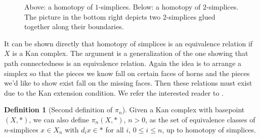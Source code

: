 \documentclass[12pt]{article}
\theoremstyle{plain}
\theoremstyle{definition}
\newtheorem{definition}[theorem]{Definition}
\theoremstyle{remark}
\begin{document}
\begin{figure}[!htp]
\begin{center}
\end{center}
\caption{Above: a homotopy of $1$-simplices. Below: a homotopy of $2$-simplices. The picture in the bottom right depicts two $2$-simplices glued together along their boundaries.}\label{F: fig23}
\end{figure}

It can be shown directly that homotopy of simplices is an equivalence relation if $X$ is  a Kan complex. The argument is a generalization of the one showing that path connectedness is an equivalence relation. Again the idea is to arrange a simplex so that the pieces we know fall on certain faces of horns and the pieces we'd like to show exist  fall on the missing faces. Then these relations must exist due to the Kan extension condition.
We refer the interested reader to \cite[Section I.3]{MAY67}.




\begin{definition}[Second definition of $\pi_n$]\label{D: pin2}
Given a Kan complex  with basepoint $(X,*)$, we can also define $\pi_n(X,*)$, $n>0$, as the set of equivalence classes of $n$-simplices $x\in X_n$ with $d_ix\in *$ for all $i$, $0\leq i\leq n$, up to homotopy of simplices. 
\end{definition}
\end{document}
